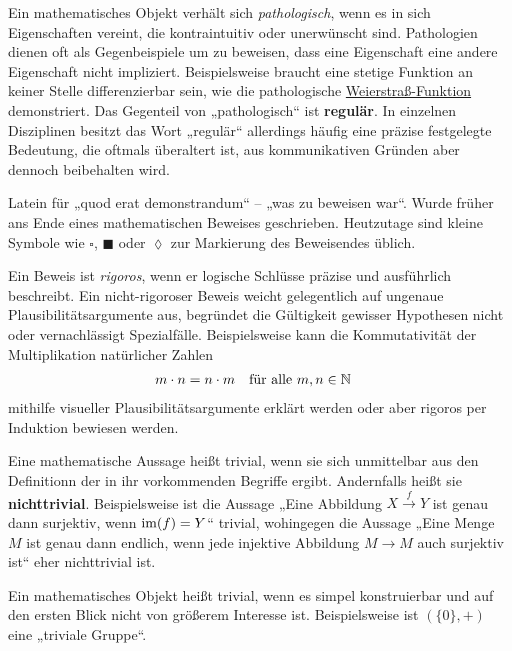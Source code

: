 \begin{description}[labelindent=0pt, leftmargin=0pt]
    \item[Pathologisch:] Ein mathematisches Objekt verhält sich \emph{pathologisch}, wenn es in sich Eigenschaften vereint, die kontraintuitiv oder unerwünscht sind. Pathologien dienen oft als Gegenbeispiele um zu beweisen, dass eine Eigenschaft eine andere Eigenschaft nicht impliziert. Beispielsweise braucht eine stetige Funktion an keiner Stelle differenzierbar sein, wie die pathologische \href{https://de.wikipedia.org/wiki/Weierstrass-Funktion}{Weierstraß-Funktion} demonstriert. Das Gegenteil von „pathologisch“ ist \textbf{regulär}. In einzelnen Disziplinen besitzt das Wort „regulär“ allerdings häufig eine präzise festgelegte Bedeutung, die oftmals überaltert ist, aus kommunikativen Gründen aber dennoch beibehalten wird.

    \item[QED:] Latein für „quod erat demonstrandum“ -- „was zu beweisen war“. Wurde früher ans Ende eines mathematischen Beweises geschrieben. Heutzutage sind kleine Symbole wie $\square$, $\blacksquare$ oder $\lozenge$ zur Markierung des Beweisendes üblich.
    
    \item[Rigoros:] Ein Beweis ist \emph{rigoros}, wenn er logische Schlüsse präzise und ausführlich beschreibt. Ein nicht-rigoroser Beweis weicht gelegentlich auf ungenaue Plausibilitätsargumente aus, begründet die Gültigkeit gewisser Hypothesen nicht oder vernachlässigt Spezialfälle. Beispielsweise kann die Kommutativität der Multiplikation natürlicher Zahlen
    \begin{align*}
        m \cdot n & = n \cdot m && \text{für alle}\ m,n\in \mathbb N
    \end{align*}
    mithilfe visueller Plausibilitätsargumente erklärt werden oder aber rigoros per Induktion bewiesen werden.

    \item[Trivial:] Eine mathematische Aussage heißt trivial, wenn sie sich unmittelbar aus den Definitionn der in ihr vorkommenden Begriffe ergibt. Andernfalls heißt sie \textbf{nichttrivial}. Beispielsweise ist die Aussage „Eine Abbildung $X\xrightarrow{f} Y$ ist genau dann surjektiv, wenn $\operatorname{im}(f)=Y$“ trivial, wohingegen die Aussage „Eine Menge $M$ ist genau dann endlich, wenn jede injektive Abbildung $M\to M$ auch surjektiv ist“ eher nichttrivial ist.
    
    Ein mathematisches Objekt heißt trivial, wenn es simpel konstruierbar und auf den ersten Blick nicht von größerem Interesse ist. Beispielsweise ist $(\{0\},+)$ eine „triviale Gruppe“. 


\end{description}
